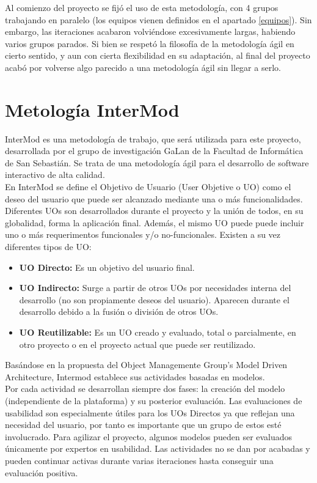 Al comienzo del proyecto se fijó el uso de esta metodología, con 4 grupos trabajando en paralelo (los equipos vienen definidos en el apartado \ref{equipos}). Sin embargo, las iteraciones acabaron volviéndose excesivamente largas, habiendo varios grupos parados. Si bien se respetó la filosofía de la metodología ágil en cierto sentido, y aun con cierta flexibilidad en su adaptación, al final del proyecto acabó por volverse algo parecido a una metodología ágil sin llegar a serlo.\\

\section{Metología InterMod}
\label{intermod}

InterMod es una metodología de trabajo, que será utilizada para este proyecto, desarrollada por el grupo de investigación GaLan de la Facultad de Informática de San Sebastián. Se trata de una metodología ágil para el desarrollo de software interactivo de alta calidad.\\

En InterMod se define el Objetivo de Usuario (User Objetive o UO) como el deseo del usuario que puede ser alcanzado mediante una o más funcionalidades. Diferentes UOs son desarrollados durante el proyecto y la unión de todos, en su globalidad, forma la aplicación final. Además, el mismo UO puede puede incluir uno o más requerimentos funcionales y/o no-funcionales. Existen a su vez diferentes tipos de UO:

\begin{itemize}
\item \textbf{UO Directo:} Es un objetivo del usuario final.
\item \textbf{UO Indirecto:} Surge a partir de otros UOs por necesidades interna del desarrollo (no son propiamente deseos del usuario). Aparecen durante el desarrollo debido a la fusión o división de otros UOs.
\item \textbf{UO Reutilizable:} Es un UO creado y evaluado, total o parcialmente, en otro proyecto o en el proyecto actual que puede ser reutilizado.
\end{itemize}

Basándose en la propuesta del Object Managemente Group’s Model Driven Architecture, Intermod establece sus actividades basadas en modelos.\\

Por cada actividad se desarrollan siempre dos fases: la creación del modelo (independiente de la plataforma) y su posterior evaluación. Las evaluaciones de usabilidad son especialmente útiles para los UOs Directos ya que reflejan una necesidad del usuario, por tanto es importante que un grupo de estos esté involucrado. Para agilizar el proyecto, algunos modelos pueden ser evaluados únicamente por expertos en usabilidad. Las actividades no se dan por acabadas y pueden continuar activas durante varias iteraciones hasta conseguir una evaluación positiva.\\

